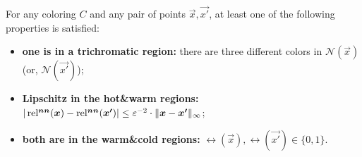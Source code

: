 \begin{lemma}
    \label{lem:lipschitz-of-the-converter}
    For any coloring $C$ and any pair of points $\vec{x}, \vec{x'}$, at least one of the following properties is satisfied:
    \begin{itemize}[itemsep=0em]
        \item {\bf one is in a trichromatic region:} there are three different colors in $\mathcal{N}(\vec{x})$ (or, $\mathcal{N}(\vec{x'})$);
        \item {\bf Lipschitz in the hot\&warm regions:} $|\operatorname*{rel^{\boldsymbol{nn}}}(\boldsymbol{x})-\operatorname*{rel^{\boldsymbol{nn}}}(\boldsymbol{x'})|\leq \varepsilon^{-2}\cdot \| {\boldsymbol{x}-\boldsymbol{x'}} \|_{\infty}$; 
        \item {\bf both are in the warm\&cold regions:} $\rel(\vec{x}),\rel(\vec{x'})\in \{0,1\}$. 
    \end{itemize}
\end{lemma}
